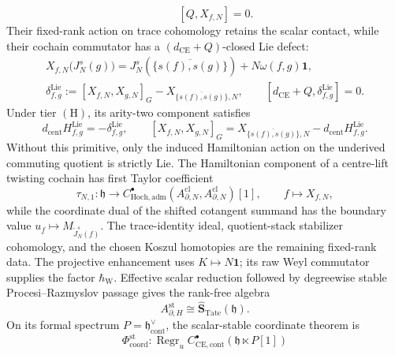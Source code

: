 \documentclass[11pt]{memoir}
\begin{document}
\begin{thm}
\begin{equation}
    \qquad [Q,X_{f,N}]=0.
  \end{equation}
  Their fixed-rank action on trace cohomology retains the scalar contact,
  while their cochain commutator has a
  \((d_{\mathrm{CE}}+Q)\)-closed Lie defect:
  \begin{equation}\label{eq:fixed-rank-trace-action}
    \begin{gathered}
      X_{f,N}\bigl(J_N^s(g)\bigr)
      =J_N^s\!\left(\overline{\{s(f),s(g)\}}\right)
        +N\omega(f,g)\mathbf1,\\
      \delta^{\mathrm{Lie}}_{f,g}
        :=[X_{f,N},X_{g,N}]_G
          -X_{\overline{\{s(f),s(g)\}},N},
      \qquad
      [d_{\mathrm{CE}}+Q,\delta^{\mathrm{Lie}}_{f,g}]=0.
    \end{gathered}
  \end{equation}
  Under tier \(\mathrm{(H)}\), its arity-two component satisfies
  \begin{equation}\label{eq:fixed-rank-lie-homotopy}
    d_{\mathrm{cent}}H^{\mathrm{Lie}}_{f,g}
      =-\delta^{\mathrm{Lie}}_{f,g},
    \qquad
    [X_{f,N},X_{g,N}]_G
      =X_{\overline{\{s(f),s(g)\}},N}
       -d_{\mathrm{cent}}H^{\mathrm{Lie}}_{f,g}.
  \end{equation}
  Without this primitive, only the induced Hamiltonian action on the
  underived commuting quotient is strictly Lie.
  The Hamiltonian component of a centre-lift twisting cochain has first
  Taylor coefficient
  \[
    \tau_{N,1}\colon\mathfrak h\longrightarrow
    C^\bullet_{\mathrm{Hoch},\mathrm{adm}}
      (A^{\mathrm{cl}}_{\partial,N},A^{\mathrm{cl}}_{\partial,N})[1],
    \qquad f\longmapsto X_{f,N},
  \]
  while the coordinate dual of the shifted cotangent summand has the
  boundary value \(u_f\mapsto M_{\widetilde J_N^s(f)}\).  The
  trace-identity ideal,
  quotient-stack stabilizer cohomology, and the chosen Koszul homotopies
  are the remaining fixed-rank data.  The projective enhancement uses
  \(K\mapsto N\mathbf1\); its raw Weyl commutator supplies the factor
  \(\hbar_{\mathrm W}\).
  Effective scalar reduction followed by degreewise stable
  Procesi--Razmyslov passage gives the rank-free algebra
  \[
    A_{\partial,H}^{\mathrm{st}}
    \cong\widehat{\mathbf S}_{\mathrm{Tate}}(\mathfrak h).
  \]
  On its formal spectrum \(P=\mathfrak h^\vee_{\mathrm{cont}}\), the
  scalar-stable coordinate theorem is
  \begin{equation}\label{eq:ce-pv-dictionary-strong}
    \Phi_{\mathrm{coord}}^{\mathrm{st}}\colon
    \operatorname{Regr}_u
    C^\bullet_{\mathrm{CE},\mathrm{cont}}(\mathfrak h\ltimes P[1])

\end{equation}
\end{thm}
\end{document}
